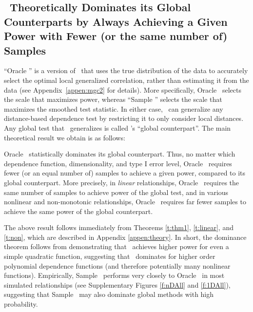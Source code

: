 \documentclass[11pt]{extarticle}
\begin{document}
\subsection*{\Mgc~Theoretically Dominates its Global Counterparts {by Always Achieving a Given Power with Fewer (or the same number of) Samples}}
\label{s:theory}

``Oracle \Mgc'' is a version of \Mgc~that uses the true distribution of the data to accurately select the optimal local generalized correlation, rather than estimating it from the data (see Appendix~\ref{appen:mgc2} for details). More specifically, Oracle \Mgc~selects the scale that maximizes power, whereas ``Sample \Mgc'' selects the scale that maximizes the smoothed test statistic.
In either case,  \Mgc~can generalize any distance-based dependence test by restricting it to only consider local distances.  Any global test that \Mgc~generalizes is called \Mgc's ``global counterpart''.  The main theoretical result we obtain is as follows:
%
\begin{thm} \label{t:dominate}
Oracle \Mgc~statistically dominates its global counterpart.
Thus, no matter which dependence function, dimensionality, and type I error level, Oracle \Mgc~requires fewer (or an equal number of) samples to achieve a given power, compared to its global counterpart.
%
More precisely, in \emph{linear} relationships, Oracle \Mgc~requires the same number of samples to achieve power of the global test, and in various nonlinear and non-monotonic relationships, Oracle \Mgc~requires far fewer samples to achieve the same power of the global counterpart.
%
\end{thm}

The above result follows immediately from Theorems \ref{t:thm1}, \ref{t:linear}, and \ref{t:non}, which are described in Appendix \ref{appen:theory}. In short, the dominance theorem follows from demonstrating that \Mgc~achieves higher power for even a simple quadratic function, suggesting that \Mgc~dominates for higher order polynomial dependence functions (and therefore potentially many nonlinear functions).
Empirically, Sample \Mgc~performs very closely to Oracle \Mgc~in most simulated relationships (see Supplementary Figures \ref{f:nDAll} and \ref{f:1DAll}), suggesting that Sample \Mgc~may also dominate global methods with high probability.
\end{document}
